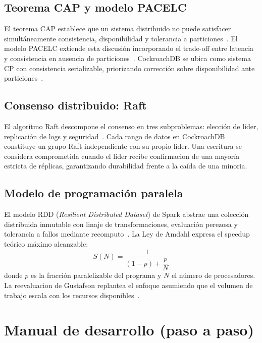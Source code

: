 \documentclass[11pt,a4paper]{article}
\begin{document}
\subsection{Teorema CAP y modelo PACELC}

    El teorema CAP establece que un sistema distribuido no puede satisfacer simultáneamente consistencia, disponibilidad y tolerancia a particiones~\cite{Brewer2012CAP}. El modelo PACELC extiende esta discusión incorporando el trade-off entre latencia y consistencia en ausencia de particiones~\cite{Abadi2012PACELC}. CockroachDB se ubica como sistema CP con consistencia serializable, priorizando corrección sobre disponibilidad ante particiones~\cite{Taft2020CockroachDB}.

\subsection{Consenso distribuido: Raft}

    El algoritmo Raft descompone el consenso en tres subproblemas: elección de líder, replicación de logs y seguridad~\cite{Ongaro2014Raft}. Cada rango de datos en CockroachDB constituye un grupo Raft independiente con su propio líder. Una escritura se considera comprometida cuando el líder recibe confirmacion de una mayoría estricta de réplicas, garantizando durabilidad frente a la caída de una minoria.

\subsection{Modelo de programación paralela}

    El modelo RDD (\textit{Resilient Distributed Dataset}) de Spark abstrae una colección distribuida inmutable con linaje de transformaciones, evaluación perezosa y tolerancia a fallos mediante recomputo~\cite{Zaharia2012RDD}. La Ley de Amdahl expresa el speedup teórico máximo alcanzable:
    \begin{equation}
        S(N) = \frac{1}{(1-p) + \dfrac{p}{N}}
        \label{eq:amdahl}
    \end{equation}
    donde $p$ es la fracción paralelizable del programa y $N$ el número de procesadores. La reevaluacion de Gustafson replantea el enfoque asumiendo que el volumen de trabajo escala con los recursos disponibles~\cite{Gustafson1988}.

\section{Manual de desarrollo (paso a paso)}
\end{document}
